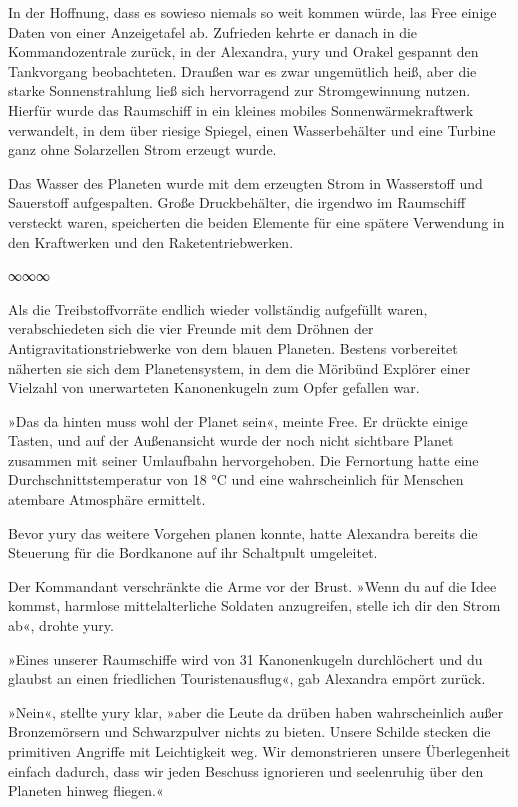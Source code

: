 In der Hoffnung, dass es sowieso niemals so weit kommen würde, las Free einige Daten von einer Anzeigetafel ab. Zufrieden kehrte er danach in die Kommandozentrale zurück, in der Alexandra, yury und Orakel gespannt den Tankvorgang beobachteten. Draußen war es zwar ungemütlich heiß, aber die starke Sonnenstrahlung ließ sich hervorragend zur Stromgewinnung nutzen. Hierfür wurde das Raumschiff in ein kleines mobiles Sonnenwärmekraftwerk verwandelt, in dem über riesige Spiegel, einen Wasserbehälter und eine Turbine ganz ohne Solarzellen Strom erzeugt wurde.

Das Wasser des Planeten wurde mit dem erzeugten Strom in Wasserstoff und Sauerstoff aufgespalten. Große Druckbehälter, die irgendwo im Raumschiff versteckt waren, speicherten die beiden Elemente für eine spätere Verwendung in den Kraftwerken und den Raketentriebwerken.

\begin{center}
    ∞∞∞
\end{center}

Als die Treibstoffvorräte endlich wieder vollständig aufgefüllt waren, verabschiedeten sich die vier Freunde mit dem Dröhnen der Antigravitationstriebwerke von dem blauen Planeten. Bestens vorbereitet näherten sie sich dem Planetensystem, in dem die Möribünd Explörer einer Vielzahl von unerwarteten Kanonenkugeln zum Opfer gefallen war.

»Das da hinten muss wohl der Planet sein«, meinte Free. Er drückte einige Tasten, und auf der Außenansicht wurde der noch nicht sichtbare Planet zusammen mit seiner Umlaufbahn hervorgehoben. Die Fernortung hatte eine Durchschnittstemperatur von 18 °C und eine wahrscheinlich für Menschen atembare Atmosphäre ermittelt.

Bevor yury das weitere Vorgehen planen konnte, hatte Alexandra bereits die Steuerung für die Bordkanone auf ihr Schaltpult umgeleitet.

Der Kommandant verschränkte die Arme vor der Brust. »Wenn du auf die Idee kommst, harmlose mittelalterliche Soldaten anzugreifen, stelle ich dir den Strom ab«, drohte yury.

»Eines unserer Raumschiffe wird von 31 Kanonenkugeln durchlöchert und du glaubst an einen friedlichen Touristenausflug«, gab Alexandra empört zurück.

»Nein«, stellte yury klar, »aber die Leute da drüben haben wahrscheinlich außer Bronzemörsern und Schwarzpulver nichts zu bieten. Unsere Schilde stecken die primitiven Angriffe mit Leichtigkeit weg. Wir demonstrieren unsere Überlegenheit einfach dadurch, dass wir jeden Beschuss ignorieren und seelenruhig über den Planeten hinweg fliegen.«

